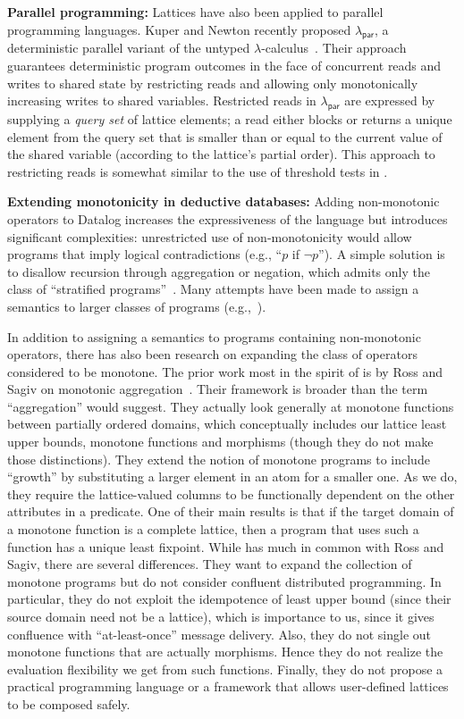\vspace{0.5em}\noindent
\textbf{Parallel programming:} Lattices have also been applied to parallel
programming languages. Kuper and Newton recently proposed
$\lambda_{\textsf{par}}$, a deterministic parallel variant of the untyped
$\lambda$-calculus~\cite{Kuper2012}. Their approach guarantees deterministic
program outcomes in the face of concurrent reads and writes to shared state by
restricting reads and allowing only monotonically increasing writes to shared
variables.  Restricted reads in $\lambda_{\textsf{par}}$ are expressed by
supplying a \emph{query set} of lattice elements; a read either blocks or
returns a unique element from the query set that is smaller than or equal to the
current value of the shared variable (according to the lattice's partial
order). This approach to restricting reads is somewhat similar to the use of
threshold tests in \lang.

\vspace{0.5em}\noindent
\textbf{Extending monotonicity in deductive databases:} Adding non-monotonic
operators to Datalog increases the expressiveness of the language but introduces
significant complexities: unrestricted use of non-monotonicity would allow
programs that imply logical contradictions (e.g., ``$p$ if $\lnot p$''). A
simple solution is to disallow recursion through aggregation or negation, which
admits only the class of ``stratified programs''~\cite{Apt1988}. Many attempts
have been made to assign a semantics to larger classes of programs
(e.g.,~\cite{Gelfond1988,Ross1990,VanGelder1991}).

In addition to assigning a semantics to programs containing non-monotonic
operators, there has also been research on expanding the class of operators
considered to be monotone. The prior work most in the spirit of \lang is by Ross
and Sagiv on monotonic aggregation~\cite{Ross1992}. Their framework is broader
than the term ``aggregation'' would suggest. They actually look generally at
monotone functions between partially ordered domains, which conceptually
includes our lattice least upper bounds, monotone functions and morphisms
(though they do not make those distinctions). They extend the notion of monotone
programs to include ``growth'' by substituting a larger element in an atom for a
smaller one. As we do, they require the lattice-valued columns to be
functionally dependent on the other attributes in a predicate. One of their main
results is that if the target domain of a monotone function is a complete
lattice, then a program that uses such a function has a unique least
fixpoint. While \lang has much in common with Ross and Sagiv, there are several
differences. They want to expand the collection of monotone programs but do not
consider confluent distributed programming. In particular, they do not exploit
the idempotence of least upper bound (since their source domain need not be a
lattice), which is importance to us, since it gives confluence with
``at-least-once'' message delivery. Also, they do not single out monotone
functions that are actually morphisms. Hence they do not realize the evaluation
flexibility we get from such functions. Finally, they do not propose a practical
programming language or a framework that allows user-defined lattices to be
composed safely.

